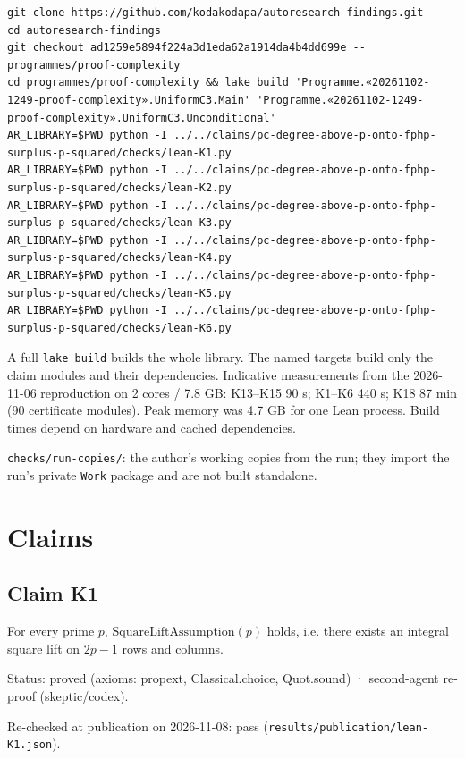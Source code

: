 \documentclass{article}
\begin{document}
\begin{verbatim}
git clone https://github.com/kodakodapa/autoresearch-findings.git
cd autoresearch-findings
git checkout ad1259e5894f224a3d1eda62a1914da4b4dd699e -- programmes/proof-complexity
cd programmes/proof-complexity && lake build 'Programme.«20261102-1249-proof-complexity».UniformC3.Main' 'Programme.«20261102-1249-proof-complexity».UniformC3.Unconditional'
AR_LIBRARY=$PWD python -I ../../claims/pc-degree-above-p-onto-fphp-surplus-p-squared/checks/lean-K1.py
AR_LIBRARY=$PWD python -I ../../claims/pc-degree-above-p-onto-fphp-surplus-p-squared/checks/lean-K2.py
AR_LIBRARY=$PWD python -I ../../claims/pc-degree-above-p-onto-fphp-surplus-p-squared/checks/lean-K3.py
AR_LIBRARY=$PWD python -I ../../claims/pc-degree-above-p-onto-fphp-surplus-p-squared/checks/lean-K4.py
AR_LIBRARY=$PWD python -I ../../claims/pc-degree-above-p-onto-fphp-surplus-p-squared/checks/lean-K5.py
AR_LIBRARY=$PWD python -I ../../claims/pc-degree-above-p-onto-fphp-surplus-p-squared/checks/lean-K6.py
\end{verbatim}

A full \texttt{lake build} builds the whole library. The named targets build only the claim modules and their dependencies. Indicative measurements from the 2026-11-06 reproduction on 2 cores / 7.8 GB: K13--K15 90 s; K1--K6 440 s; K18 87 min (90 certificate modules). Peak memory was 4.7 GB for one Lean process. Build times depend on hardware and cached dependencies.

\texttt{checks/run-copies/}: the author's working copies from the run; they import the run's private \texttt{Work} package and are not built standalone.

\section{Claims}

\subsection*{Claim K1}

For every prime $p$, $\mathrm{SquareLiftAssumption}(p)$ holds, i.e. there exists an integral square lift on $2p-1$ rows and columns.

Status: proved (axioms: propext, Classical.choice, Quot.sound) · second-agent re-proof (skeptic/codex).

Re-checked at publication on 2026-11-08: pass (\texttt{results/publication/lean-K1.json}).
\end{document}
